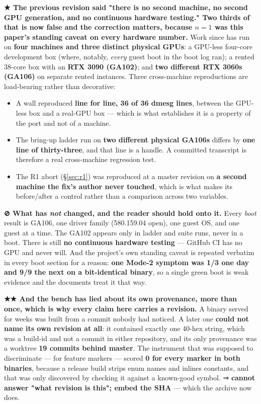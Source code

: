 \documentclass[10.5pt]{article}
\begin{document}
\textbf{★ The previous revision said "there is no second machine, no second GPU generation, and no
continuous hardware testing." Two thirds of that is now false and the correction matters,
because $n=1$ was this paper's standing caveat on every hardware number.} Work since has run on
\textbf{four machines and three distinct physical GPUs}: a GPU-less four-core development box
(where, notably, \emph{every} guest boot in the boot log ran); a rented 38-core box with an
\textbf{RTX 3090 (GA102)}; and \textbf{two different RTX 3060s (GA106)} on separate rented
instances. Three cross-machine reproductions are load-bearing rather than decorative:

\begin{itemize}
\item A wall reproduced \textbf{line for line, 36 of 36 dmesg lines}, between the GPU-less box and
  a real-GPU box — which is what establishes it is a property of the port and not of a machine.
\item The bring-up ladder run on \textbf{two different physical GA106s} differs by \textbf{one
  line of thirty-three}, and that line is a handle. A committed transcript is therefore a real
  cross-machine regression test.
\item The R1 abort (\S\ref{sec:r1}) was reproduced at a master revision on \textbf{a second
  machine the fix's author never touched}, which is what makes its before/after a control rather
  than a comparison across two variables.
\end{itemize}

\textbf{⊘ What has \emph{not} changed, and the reader should hold onto it.} Every \emph{boot}
result is GA106, one driver family (580.159.04 open), one guest OS, and one guest at a time. The
GA102 appears only in ladder and suite runs, never in a boot. There is still \textbf{no continuous
hardware testing} — GitHub CI has no GPU and never will. And the project's own standing caveat is
repeated verbatim in every boot section for a reason: \textbf{one Mode-2 symptom was 1/3 one day
and 9/9 the next on a bit-identical binary}, so a single green boot is weak evidence and the
documents treat it that way.

\begin{warnbox}\small
\textbf{★★ And the bench has lied about its own provenance, more than once, which is why every
claim here carries a revision.} A binary served for weeks was built from a commit nobody had
noticed. A later one \textbf{could not name its own revision at all}: it contained exactly one
40-hex string, which was a build-id and not a commit in either repository, and its only
provenance was a worktree \textbf{19 commits behind master}. The instrument that was supposed to
discriminate —  for feature markers — scored \textbf{0 for every marker in both
binaries}, because a release build strips enum names and inlines constants, and that was only
discovered by checking it against a known-good symbol. ⇒ \textbf{ cannot answer
"what revision is this"; embed the SHA} — which the archive now does.
\end{warnbox}
\end{document}
